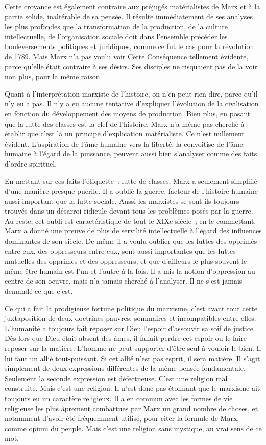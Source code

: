 \documentclass[french,twoside]{book} %
\begin{document}
Cette croyance est également contraire aux préjugés matérialistes de Marx et à la partie solide, inaltérable de sa pensée. Il résulte immédiatement de ses analyses les plus profondes que la transformation de la production, de la culture intellectuelle, de l'organisation sociale doit dans l'ensemble précéder les bouleversements politiques et juridiques, comme ce fut le cas pour la révolution de 1789. Mais Marx n'a pas voulu voir Cette Conséquence tellement évidente, parce qu'elle était contraire à ses désirs. Ses disciples ne risquaient pas de la voir non plus, pour la même raison.\par
Quant à l'interprétation marxiste de l'histoire, on n'en peut rien dire, parce qu'il n'y eu a pas. Il n'y a eu aucune tentative d'expliquer l'évolution de la civilisation en fonction du développement des moyens de production. Bien plus, en posant que la lutte des classes est la clef de l'histoire, Marx n'a même pas cherché à établir que c'est là un principe d'explication matérialiste. Ce n'est nullement évident. L'aspiration de l'âme humaine vers la liberté, la convoitise de l'âme humaine à l'égard de la puissance, peuvent aussi bien s'analyser comme des faits d'ordre spirituel.\par
En mettant sur ces faits l'étiquette : lutte de classes, Marx a seulement simplifié d'une manière presque puérile. Il a oublié la guerre, facteur de l'histoire humaine aussi important que la lutte sociale. Aussi les marxistes se sont-ils toujours trouvés dans un désarroi ridicule devant tous les problèmes posés par la guerre. Au reste, cet oubli est caractéristique de tout le XIXe siècle ; en le commettant, Marx a donné une preuve de plus de servilité intellectuelle à l'égard des influences dominantes de son siècle. De même il a voulu oublier que les luttes des opprimés entre eux, des oppresseurs entre eux, sont aussi importantes que les luttes mutuelles des opprimes et des oppresseurs, et que d'ailleurs le plus souvent le même être humain est l'un et l'autre à la fois. Il a mis la notion d'oppression au centre de son oeuvre, mais n'a jamais cherché à l'analyser. Il ne s'est jamais demandé ce que c'est.\par
Ce qui a fait la prodigieuse fortune politique du marxisme, c'est avant tout cette juxtaposition de deux doctrines pauvres, sommaires et incompatibles entre elles. L'humanité a toujours fait reposer sur Dieu l'espoir d'assouvir sa soif de justice. Dès lors que Dieu était absent des âmes, il fallait perdre cet espoir ou le faire reposer sur la matière. L'homme ne peut supporter d'être seul à vouloir le bien. Il lui faut un allié tout-puissant. Si cet allié n'est pas esprit, il sera matière. Il s'agit simplement de deux expressions différentes de la même pensée fondamentale. Seulement la seconde expression est défectueuse. C'est une religion mal construite. Mais c'est une religion. Il n'est donc pas étonnant que le marxisme ait toujours eu un caractère religieux. Il a en commun avec les formes de vie religieuse les plus âprement combattues par Marx un grand nombre de choses, et notamment d'avoir été fréquemment utilisé, pour citer la formule de Marx, comme opium du peuple. Mais c'est une religion sans mystique, au vrai sens de ce mot.\par
\end{document}
